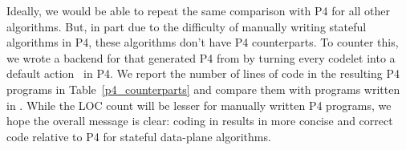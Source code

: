 Ideally, we would be able to repeat the same comparison with P4 for all other
algorithms. But, in part due to the difficulty of manually writing stateful
algorithms in P4, these algorithms don't have P4 counterparts. To counter this,
we wrote a backend for \pktlanguage that generated P4 from \pktlanguage by
turning every codelet into a default action~\cite{p4spec} in P4.  We report the
number of lines of code in the resulting P4 programs in
Table~\ref{p4_counterparts} and compare them with programs written in
\pktlanguage. While the LOC count will be lesser for manually written P4
programs, we hope the overall message is clear: coding in \pktlanguage results
in more concise and correct code relative to P4 for stateful data-plane algorithms.


